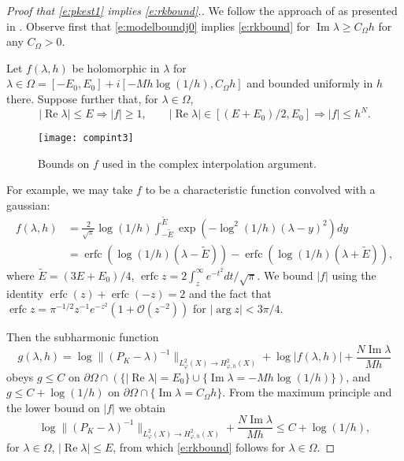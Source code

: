 \documentclass[reqno, 12pt]{amsart}
\newcommand \Oh {\mathcal{O}}
\newcommand \D {\partial}
\DeclareMathOperator \re {Re}
\DeclareMathOperator \im {Im}
\DeclareMathOperator \erfc {erfc}
\theoremstyle{definition}
\numberwithin{equation}{section}
\numberwithin{prop}{section}
\numberwithin{figure}{section}
\begin{document}
\begin{proof}[Proof that \eqref{e:pkest1} implies \eqref{e:rkbound}.]

We follow the approach of \cite{tz} as presented in \cite[Lemma 3.1]{nsz}. Observe first that \eqref{e:modelboundj0} implies \eqref{e:rkbound} for  $\im \lambda \ge C_\Omega h$ for any $C_\Omega>0$.

Let $f(\lambda,h)$ be holomorphic in  $\lambda$  for $\lambda \in \Omega = [-E_0,E_0] + i [-Mh\log(1/h), C_\Omega h]$ and bounded uniformly in $h$  there. Suppose further that, for $\lambda \in \Omega$,
\[
|\re \lambda|  \le E \Rightarrow |f| \ge 1, \qquad |\re \lambda| \in [(E+E_0)/2, E_0] \Rightarrow |f| \le h^N.
\]

\begin{figure}[htbp]
\texttt{[image: compint3]}
\caption{Bounds on $f$ used in the complex interpolation argument.}
\end{figure}

For example, we may take $f$ to be a characteristic function convolved with a gaussian:
\[\begin{split}
f(\lambda, h) &= \frac 2 {\sqrt \pi} \log(1/h) \int_{-\tilde E}^{\tilde E} \exp\left(-\log^2(1/h) (\lambda - y)^2\right)dy\\
& = \erfc(\log(1/h)(\lambda - \tilde E)) - \erfc(\log(1/h)(\lambda + \tilde E)),
\end{split}\]
where $\tilde E = (3E+E_0)/4$, $\erfc z = 2 \int_z^\infty e^{-t^2}dt/\sqrt\pi$. We bound $|f|$ using the identity $\erfc(z) + \erfc(-z)= 2$ and the  fact that  $\erfc z =  \pi^{-1/2}z^{-1}e^{-z^2} (1 + \Oh(z^{-2}))$ for $|\arg z| < 3\pi/4$.

Then the subharmonic function
\[
g(\lambda,h) = \log \|(P_K -\lambda)^{-1}\|_{L^2_\varphi(X) \to H^2_{\varphi,h}(X)} + \log |f(\lambda,h)| + \frac{N \im \lambda}{Mh}
\]
obeys $g \le C$ on $\D \Omega \cap (\{|\re \lambda| = E_0\} \cup \{\im \lambda = -Mh\log(1/h)\})$, and  $g \le C + \log(1/h)$ on $\D \Omega \cap \{\im \lambda = C_\Omega h\}$. From the maximum principle and the lower bound on $|f|$ we obtain
\[
\log \|(P_K -\lambda)^{-1}\|_{L^2_\varphi(X) \to H^2_{\varphi,h}(X)} + \frac{N \im \lambda}{Mh} \le C + \log(1/h),
\]
for $\lambda \in \Omega$, $|\re \lambda| \le E$, from which \eqref{e:rkbound} follows for $\lambda \in \Omega$. 
\end{proof}
\end{document}

